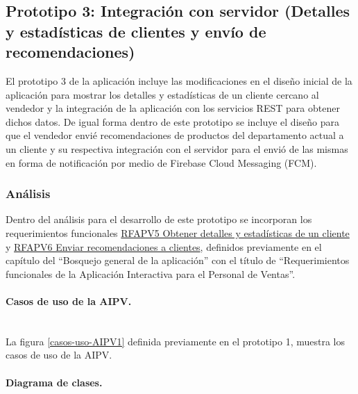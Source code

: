\subsection{Prototipo 3: Integración con servidor (Detalles y estadísticas de clientes y envío de recomendaciones)}

El prototipo 3 de la aplicación incluye las modificaciones en el diseño inicial de la aplicación para mostrar los detalles y estadísticas de un cliente cercano al vendedor y la integración de la aplicación con los servicios REST para obtener dichos datos. De igual forma dentro de este prototipo se incluye el diseño para que el vendedor envié recomendaciones de productos del departamento actual a un cliente y su respectiva integración con el servidor para el envió de las mismas en forma de notificación por medio de Firebase Cloud Messaging (FCM). \\ \par


\subsubsection{Análisis}

Dentro del análisis para el desarrollo de este prototipo se incorporan los requerimientos funcionales \hyperlink{RFAPV}{RFAPV5 Obtener detalles y estadísticas de un cliente} y \hyperlink{RFAPV}{RFAPV6 Enviar recomendaciones a clientes}, definidos previamente en el capítulo del ``Bosquejo general de la aplicación''  con el título de ``Requerimientos funcionales de la Aplicación Interactiva para el Personal de Ventas''. \\ \par

\paragraph{Casos de uso de la AIPV.} ~\\

La figura \ref{casos-uso-AIPV1} definida previamente en el prototipo 1, muestra los casos de uso de la AIPV.

\paragraph{Diagrama de clases.} ~\\

